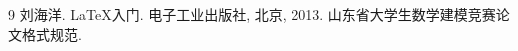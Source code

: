 
\begin{thebibliography}{9}
    刘海洋.
    \newblock \LaTeX {}入门\allowbreak[J].
    \newblock 电子工业出版社, 北京, 2013.
    山东省大学生数学建模竞赛论文格式规范.
\end{thebibliography}
